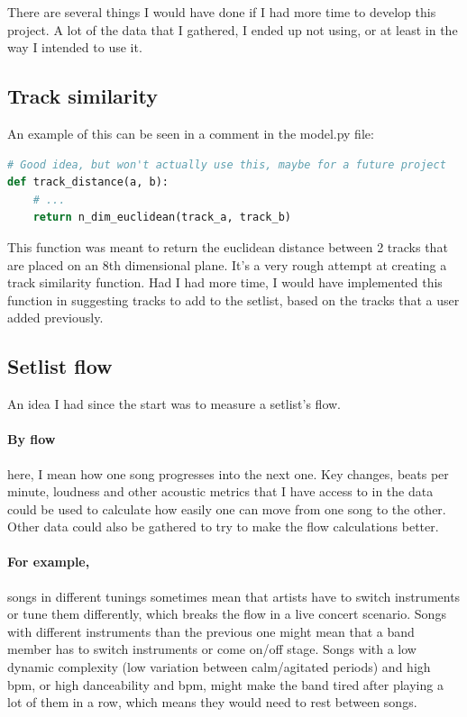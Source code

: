 \documentclass[10pt, a4paper]{article}
\begin{document}
	There are several things I would have done if I had more time to develop this project. A lot of the data that I gathered, I ended up not using, or at least in the way I intended to use it. 
	
	\subsection{Track similarity}	
	An example of this can be seen in a comment in the model.py file:
\begin{lstlisting}[language = Python, caption = Track distance function definition]
# Good idea, but won't actually use this, maybe for a future project
def track_distance(a, b):
	# ...
	return n_dim_euclidean(track_a, track_b)
\end{lstlisting} 
	This function was meant to return the euclidean distance between 2 tracks that are placed on an 8th dimensional plane. It's a very rough attempt at creating a track similarity function. Had I had more time, I would have implemented this function in suggesting tracks to add to the setlist, based on the tracks that a user added previously.

	\subsection{Setlist flow}
	An idea I had since the start was to measure a setlist's flow.
	\paragraph{By flow} here, I mean how one song progresses into the next one. Key changes, beats per minute, loudness and other acoustic metrics that I have access to in the data could be used to calculate how easily one can move from one song to the other. Other data could also be gathered to try to make the flow calculations better.
	\paragraph{For example,} songs in different tunings sometimes mean that artists have to switch instruments or tune them differently, which breaks the flow in a live concert scenario.
	Songs with different instruments than the previous one might mean that a band member has to switch instruments or come on/off stage.
	Songs with a low dynamic complexity (low variation between calm/agitated periods) and high bpm, or high danceability and bpm, might make the band tired after playing a lot of them in a row, which means they would need to rest between songs.
\end{document}
